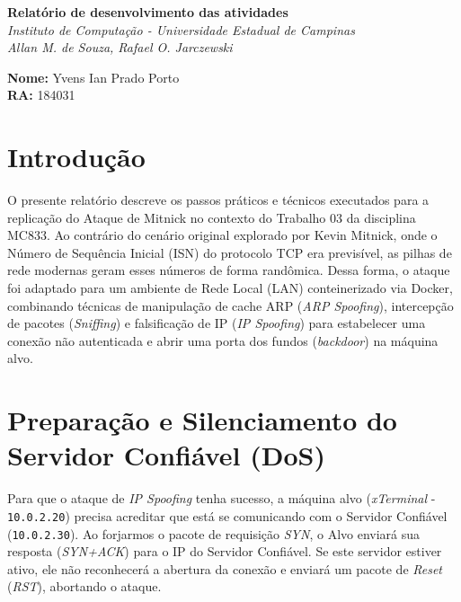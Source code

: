 \documentclass{article}
\begin{document}
\thispagestyle{empty} %
\noindent
{
\selectfont %
\fontsize{11pt}{13.2pt}\selectfont %
\begin{minipage}[c]{0.15\textwidth}
    \centering
    \LogoUnicamp %
\end{minipage}
\hfill
\begin{minipage}[c]{0.65\textwidth}
    \centering
    \textbf{Relatório de desenvolvimento das atividades}\\[0.2cm]
    \textit{Instituto de Computação - Universidade Estadual de Campinas\\Allan M. de Souza, Rafael O. Jarczewski}
\end{minipage}
\hfill
\begin{minipage}[c]{0.15\textwidth}
    \centering
    \LogoIcUnicamp %
\end{minipage}

\vspace{1cm}
}

\noindent\textbf{Nome:} Yvens Ian Prado Porto\\
\textbf{RA:} 184031

\section{Introdução}
O presente relatório descreve os passos práticos e técnicos executados para a replicação do Ataque de Mitnick no contexto do Trabalho 03 da disciplina MC833. Ao contrário do cenário original explorado por Kevin Mitnick, onde o Número de Sequência Inicial (ISN) do protocolo TCP era previsível, as pilhas de rede modernas geram esses números de forma randômica. Dessa forma, o ataque foi adaptado para um ambiente de Rede Local (LAN) conteinerizado via Docker, combinando técnicas de manipulação de cache ARP (\textit{ARP Spoofing}), intercepção de pacotes (\textit{Sniffing}) e falsificação de IP (\textit{IP Spoofing}) para estabelecer uma conexão não autenticada e abrir uma porta dos fundos (\textit{backdoor}) na máquina alvo.

\section{Preparação e Silenciamento do Servidor Confiável (DoS)}
Para que o ataque de \textit{IP Spoofing} tenha sucesso, a máquina alvo (\textit{xTerminal} - \texttt{10.0.2.20}) precisa acreditar que está se comunicando com o Servidor Confiável (\texttt{10.0.2.30}). Ao forjarmos o pacote de requisição \textit{SYN}, o Alvo enviará sua resposta (\textit{SYN+ACK}) para o IP do Servidor Confiável. Se este servidor estiver ativo, ele não reconhecerá a abertura da conexão e enviará um pacote de \textit{Reset} (\textit{RST}), abortando o ataque.
\end{document}
